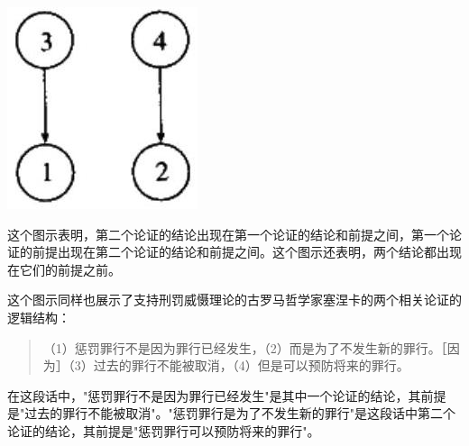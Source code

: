 \begin{center}
\includegraphics[width=\textwidth]{images/2025_05_15_6a28331d5e7c993ad07ag-035.jpg}
\end{center}

这个图示表明，第二个论证的结论出现在第一个论证的结论和前提之间，第一个论证的前提出现在第二个论证的结论和前提之间。这个图示还表明，两个结论都出现在它们的前提之前。

这个图示同样也展示了支持刑罚威慑理论的古罗马哲学家塞涅卡的两个相关论证的逻辑结构：
\begin{quotation}
（1）惩罚罪行不是因为罪行已经发生，（2）而是为了不发生新的罪行。［因为］（3）过去的罪行不能被取消，（4）但是可以预防将来的罪行。
\end{quotation}

在这段话中，"惩罚罪行不是因为罪行已经发生"是其中一个论证的结论，其前提是"过去的罪行不能被取消"。"惩罚罪行是为了不发生新的罪行"是这段话中第二个论证的结论，其前提是"惩罚罪行可以预防将来的罪行"。

\begin{center}
\end{center} 